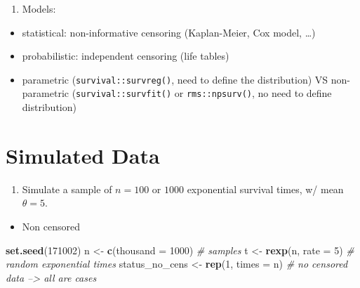 \documentclass[]{book}
\newenvironment{Shaded}{\begin{snugshade}}{\end{snugshade}}
\newcommand{\KeywordTok}[1]{\textcolor[rgb]{0.13,0.29,0.53}{\textbf{{#1}}}}
\newcommand{\DataTypeTok}[1]{\textcolor[rgb]{0.13,0.29,0.53}{{#1}}}
\newcommand{\DecValTok}[1]{\textcolor[rgb]{0.00,0.00,0.81}{{#1}}}
\newcommand{\StringTok}[1]{\textcolor[rgb]{0.31,0.60,0.02}{{#1}}}
\newcommand{\CommentTok}[1]{\textcolor[rgb]{0.56,0.35,0.01}{\textit{{#1}}}}
\newcommand{\NormalTok}[1]{{#1}}
\providecommand{\tightlist}{%
  \setlength{\itemsep}{0pt}\setlength{\parskip}{0pt}}
\theoremstyle{definition}
\theoremstyle{definition}
\theoremstyle{definition}
\theoremstyle{remark}
\begin{document}
\begin{enumerate}
\def\labelenumi{\arabic{enumi}.}
\setcounter{enumi}{3}
\tightlist
\item
  Models:
\end{enumerate}

\begin{itemize}
\tightlist
\item
  statistical: non-informative censoring (Kaplan-Meier, Cox model,
  \ldots{})
\item
  probabilistic: independent censoring (life tables)
\item
  parametric (\texttt{survival::survreg()}, need to define the
  distribution) VS non-parametric (\texttt{survival::survfit()} or
  \texttt{rms::npsurv()}, no need to define distribution)
\end{itemize}

\section{Simulated Data}\label{sumulation1}

\begin{enumerate}
\def\labelenumi{\arabic{enumi}.}
\tightlist
\item
  Simulate a sample of \(n = 100\) or \(1000\) exponential survival
  times, w/ mean \(\theta = 5\).
\end{enumerate}

\begin{itemize}
\tightlist
\item
  Non censored
\end{itemize}

\begin{Shaded}
\begin{Highlighting}[]
\KeywordTok{set.seed}\NormalTok{(}\DecValTok{171002}\NormalTok{)}
\NormalTok{n              <-}\StringTok{ }\KeywordTok{c}\NormalTok{(}\DataTypeTok{thousand =} \DecValTok{1000}\NormalTok{)                                   }\CommentTok{# samples}
\NormalTok{t              <-}\StringTok{ }\KeywordTok{rexp}\NormalTok{(n, }\DataTypeTok{rate =} \DecValTok{5}\NormalTok{)                   }\CommentTok{# random exponential times}
\NormalTok{status_no_cens <-}\StringTok{ }\KeywordTok{rep}\NormalTok{(}\DecValTok{1}\NormalTok{, }\DataTypeTok{times =} \NormalTok{n)         }\CommentTok{# no censored data --> all are cases}
\end{Highlighting}
\end{Shaded}
\end{document}
